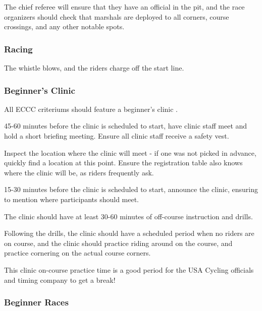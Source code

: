 \documentclass[
  letterpaper, %
  fontsize=10pt, %
  twoside=true,
  chapterentrydots=true, %
  numbers=noenddot,
  fontmethod=tex,
]{kaobook}
\begin{document}
The chief referee will ensure that they have an official in the pit, and the race organizers should check that marshals are deployed to all corners, course crossings, and any other notable spots.

\subsubsection{Racing}

The whistle blows, and the riders charge off the start line.


\subsubsection{Beginner's Clinic}

All ECCC criteriums should feature a
beginner's clinic%
%
.


45-60 minutes before the clinic is scheduled to start,
have clinic staff meet and hold a short briefing meeting.
Ensure all clinic staff receive a safety vest.

Inspect the location where the clinic will meet - if one was not picked in advance, quickly find a location at this point.
Ensure the registration table also knows where the clinic will be, as riders frequently ask.

15-30 minutes before the clinic is scheduled to start,
announce the clinic, ensuring to mention where participants should meet.

The clinic should have at least 30-60 minutes of off-course instruction and drills.

Following the drills, the clinic should have a scheduled period when no riders are on course, and the clinic should practice riding around on the course,
and practice cornering on the actual course corners.

This clinic on-course practice time is a good period for the USA Cycling officials and timing company to get a break!

\subsubsection{Beginner Races}
\end{document}
